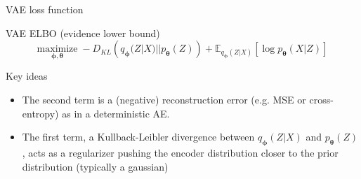 \documentclass{beamer}
\begin{document}
  \begin{frame}{VAE loss function}

    
    \begin{exampleblock}{VAE ELBO (evidence lower bound)}
      \vspace{-0.25cm}
      \begin{equation*}
        \underset{\boldsymbol{\phi},\boldsymbol{\theta}}{\text{maximize}} \; -D_{KL}\left(q_{\boldsymbol{\phi}}(Z|X)||p_{\boldsymbol{\theta}}(Z)\right) + \mathbb{E}_{q_{\boldsymbol{\phi}}(Z|X)}\left[\log p_{\boldsymbol{\theta}}(X|Z)\right]
      \end{equation*}
    \end{exampleblock}

    \begin{alertblock}{Key ideas}
      \begin{itemize}
        \item The second term is a (negative) \alert{reconstruction error} (e.g. MSE or cross-entropy) as in a deterministic AE.
        \item The first term, a Kullback-Leibler divergence between $q_{\boldsymbol{\phi}}(Z|X)$ and $p_{\boldsymbol{\theta}}(Z)$, acts as a \alert{regularizer} pushing the encoder distribution closer to the prior distribution (typically a gaussian)
      \end{itemize}
    \end{alertblock}

  \end{frame}
\end{document}
